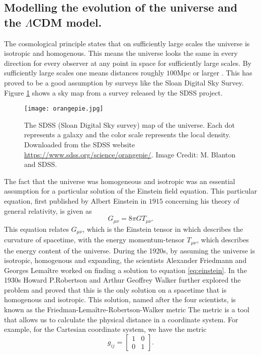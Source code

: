 \subsection{Modelling the evolution of the universe and the $\Lambda$CDM model.}
The cosmological principle states that on sufficiently
large scales the universe is isotropic and homogenous. This means the universe
looks the same in every direction for every observer at any point in space for
sufficiently large scales. By sufficiently large scales one means
distances roughly $100$Mpc or larger \cite[p.~12]{ryden2017introduction}. This has proved to be a good
assumption by surveys like the Sloan Digital Sky Survey\cite{sloanhomogenous}. Figure \ref{fig:sdssmap} shows a sky map from a survey released by the SDSS project.\\
\begin{figure}[htbp]
    \texttt{[image: orangepie.jpg]}
    \caption{The SDSS (Sloan Digital Sky survey) map of the universe. Each dot represents a galaxy and the color scale represents the local density. Downloaded from the SDSS website \url{https://www.sdss.org/science/orangepie/}. Image Credit: M. Blanton and SDSS.}
    \label{fig:sdssmap}
\end{figure}
The fact that the universe was homogeneous and isotropic was an essential assumption
for a particular solution of the Einstein field equation. 
This particular equation, first published by Albert Einstein in $1915$ \cite{Einstein1915} concerning his theory of general relativity, is given as
\begin{equation}\label{eq:einstein}
    G_{\mu\nu}=8\pi GT_{\mu\nu}.
\end{equation}
This equation relates $G_{\mu\nu}$, which is the Einstein tensor in which describes the curvature of spacetime, with the energy momentum-tensor
$T_{\mu\nu}$, which describes the energy content of the universe. During the 1920s, by assuming the universe is isotropic, homogenous and expanding, the scientists Alexander Friedmann and Georges Lemaître worked on finding a solution to equation \ref{eq:einstein}. In the 1930s Howard P.Robertson and Arthur Geoffrey Walker further explored the problem and proved that this is the only solution on a spacetime that is homogenous and isotropic.
This solution, named after the four scientists, is known as the Friedman-Lemaître-Robertson-Walker metric
The metric is a tool that allows us to calculate the physical distance in a coordinate system.
For example, for the Cartesian coordinate system, we have the metric 
\begin{equation}
    g_{ij}=
    \begin{bmatrix}
        1 & 0 \\
        0 & 1 
    \end{bmatrix}.
\end{equation}
